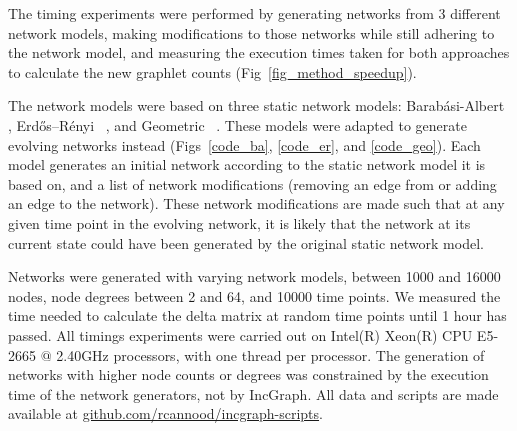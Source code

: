 The timing experiments were performed by generating networks from 3 different network models, making modifications to those networks while still adhering to the network model, and measuring the execution times taken for both approaches to calculate the new graphlet counts (Fig~\ref{fig_method_speedup}). 



The network models were based on three static network models: Barab\'asi-Albert~ \cite{albert_statisticalmechanicscomplex_2002}, Erd\H{o}s--R\'enyi~ \cite{erdos_randomgraphs_1959}, and Geometric~ \cite{appel_minimumvertexdegree_1997}. These models were adapted to generate evolving networks instead (Figs~\ref{code_ba}, \ref{code_er}, and \ref{code_geo}).
Each model generates an initial network according to the static network model it is based on, and a list of network modifications (removing an edge from or adding an edge to the network). These network modifications are made such that at any given time point in the evolving network, it is likely that the network at its current state could have been generated by the original static network model.

Networks were generated with varying network models, between 1000 and 16000 nodes, node degrees between 2 and 64, and 10000 time points. We measured the time needed to calculate the delta matrix at random time points until 1 hour has passed. All timings experiments were carried out on Intel(R) Xeon(R) CPU E5-2665 $@$ 2.40GHz processors, with one thread per processor.
The generation of networks with higher node counts or degrees was constrained by the execution time of the network generators, not by IncGraph. All data and scripts are made available at \href{https://github.com/rcannood/incgraph-scripts}{github.com/rcannood/incgraph-scripts}.

